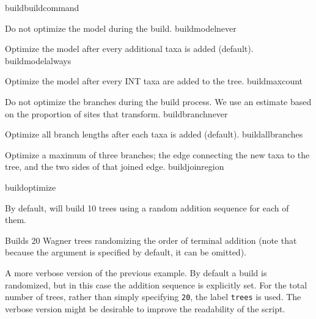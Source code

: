 \begin{command}{build}{buildcommand}
\begin{arguments}
{            \begin{description}

                    {Do not optimize the model during the build.}
                    {buildmodelnever}

                    {Optimize the model after every additional taxa is added (default).}
                    {buildmodelalways}

                    {Optimize the model after every INT taxa are added to the tree.}
                    {buildmaxcount}
                    
                    {Do not optimize the branches during the build process. We use
                    an estimate based on the proportion of sites that transform.}
                    {buildbranchnever}

                    {Optimize all branch lengths after each taxa is added (default).}
                    {buildallbranches}

                    {Optimize a maximum of three branches; the edge connecting
                    the new taxa to the tree, and the two sides of that joined
                    edge.}
                    {buildjoinregion}

            \end{description}
            }
            {buildoptimize}

   \end{arguments}
      
       {By default, \poy will build 10 trees using a random addition sequence for
       each of them.}

	\begin{poyexamples}
            {Builds 20 Wagner trees randomizing the order of terminal
            addition (note that because the argument  is specified by default, 
            it can be omitted).}

            {A more verbose version of the previous example. By default a build
            is randomized, but in this case the addition sequence is explicitly
            set. For the total number of trees, rather than simply specifying \texttt{20},
            the label \texttt{trees} is used. The verbose version might be desirable
            to improve the readability of the script.}


\end{poyexamples}
\end{command}
